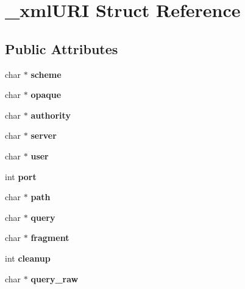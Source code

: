 \hypertarget{struct__xml_u_r_i}{\section{\-\_\-xml\-U\-R\-I Struct Reference}
\label{struct__xml_u_r_i}
}
\subsection*{Public Attributes}
\begin{DoxyCompactItemize}
\item 
\hypertarget{struct__xml_u_r_i_a98213a6dab42b0d5a3f8c87eed72acf4}{char $\ast$ {\bfseries scheme}}\label{struct__xml_u_r_i_a98213a6dab42b0d5a3f8c87eed72acf4}

\item 
\hypertarget{struct__xml_u_r_i_a335b3ef2183b31f15f51dd1b2c6241b9}{char $\ast$ {\bfseries opaque}}\label{struct__xml_u_r_i_a335b3ef2183b31f15f51dd1b2c6241b9}

\item 
\hypertarget{struct__xml_u_r_i_a9fc857bdd1702385e563977c2116fe95}{char $\ast$ {\bfseries authority}}\label{struct__xml_u_r_i_a9fc857bdd1702385e563977c2116fe95}

\item 
\hypertarget{struct__xml_u_r_i_a638c9f05ef24bf892d7a00ebf803b98a}{char $\ast$ {\bfseries server}}\label{struct__xml_u_r_i_a638c9f05ef24bf892d7a00ebf803b98a}

\item 
\hypertarget{struct__xml_u_r_i_ab620b70b2d63af398fc84281c4af421a}{char $\ast$ {\bfseries user}}\label{struct__xml_u_r_i_ab620b70b2d63af398fc84281c4af421a}

\item 
\hypertarget{struct__xml_u_r_i_a8460fd17316181c550e4f5b04e212eba}{int {\bfseries port}}\label{struct__xml_u_r_i_a8460fd17316181c550e4f5b04e212eba}

\item 
\hypertarget{struct__xml_u_r_i_ad592348964cebdf912086a3f3f8d686c}{char $\ast$ {\bfseries path}}\label{struct__xml_u_r_i_ad592348964cebdf912086a3f3f8d686c}

\item 
\hypertarget{struct__xml_u_r_i_ae7949d2e45af4b2fea60b3b51f6f991e}{char $\ast$ {\bfseries query}}\label{struct__xml_u_r_i_ae7949d2e45af4b2fea60b3b51f6f991e}

\item 
\hypertarget{struct__xml_u_r_i_ad9ebb4fe051996bba69c4db86836db7b}{char $\ast$ {\bfseries fragment}}\label{struct__xml_u_r_i_ad9ebb4fe051996bba69c4db86836db7b}

\item 
\hypertarget{struct__xml_u_r_i_a88f7bca5886e16c467eb1e1d4e729059}{int {\bfseries cleanup}}\label{struct__xml_u_r_i_a88f7bca5886e16c467eb1e1d4e729059}

\item 
\hypertarget{struct__xml_u_r_i_aad140cbc01f17eb488e4a798d91211e9}{char $\ast$ {\bfseries query\-\_\-raw}}\label{struct__xml_u_r_i_aad140cbc01f17eb488e4a798d91211e9}

\end{DoxyCompactItemize}


